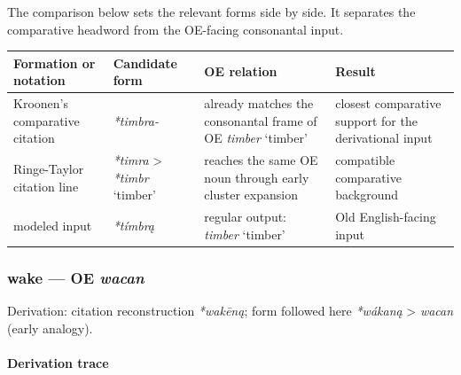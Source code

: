 \documentclass[
  british,
  a4paper,
]{article}
\newcounter{none} %
\providecommand{\Recon}[1]{\emph{*#1}}
\begin{document}
The comparison below sets the relevant forms side by side. It separates
the comparative headword from the OE-facing consonantal input.

{\def\LTcaptype{none} %
\begin{longtable}[]{@{}
  >{\raggedright\arraybackslash}p{}
  >{\raggedright\arraybackslash}p{}
  >{\raggedright\arraybackslash}p{}
  >{\raggedright\arraybackslash}p{}@{}}
\toprule\noalign{}
\begin{minipage}[b]{\linewidth}\raggedright
Formation or notation
\end{minipage} & \begin{minipage}[b]{\linewidth}\raggedright
Candidate form
\end{minipage} & \begin{minipage}[b]{\linewidth}\raggedright
OE relation
\end{minipage} & \begin{minipage}[b]{\linewidth}\raggedright
Result
\end{minipage} \\
\midrule\noalign{}
\endhead
\bottomrule\noalign{}
\endlastfoot
Kroonen's comparative citation & {\emph{*timbra-}} & already matches the
consonantal frame of OE {\emph{timber}} `timber' & closest comparative
support for the derivational input \\
Ringe-Taylor citation line & {\emph{*timra}} \textgreater{}
\Recon{timbr} `timber' & reaches the same OE noun through early cluster
expansion & compatible comparative background \\
modeled input & {\emph{*tímbrą}} & regular output: {\emph{timber}}
`timber' & Old English-facing input \\
\end{longtable}
}

\subsubsection{\texorpdfstring{wake --- OE
\emph{wacan}}{wake --- OE wacan}}\label{wake-oe-wacan}

Derivation: citation reconstruction \emph{*wakēną}; form followed here
\emph{*wákaną} \textgreater{} \emph{wacan} (early analogy).

\paragraph{Derivation trace}\label{derivation-trace-115}
\end{document}
